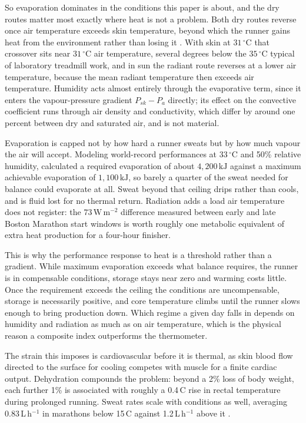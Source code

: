 \documentclass[11pt]{article}
\renewcommand{\_}{\textunderscore\allowbreak}
\begin{document}
So evaporation dominates in the conditions this paper is about, and the dry routes matter most exactly where heat is not a problem. Both dry routes reverse once air temperature exceeds skin temperature, beyond which the runner gains heat from the environment rather than losing it \citep{cheuvront2001}. With skin at $31\,^{\circ}$C that crossover sits near $31\,^{\circ}$C air temperature, several degrees below the $35\,^{\circ}$C typical of laboratory treadmill work, and in sun the radiant route reverses at a lower air temperature, because the mean radiant temperature then exceeds air temperature. Humidity acts almost entirely through the evaporative term, since it enters the vapour-pressure gradient $P_{sk}-P_a$ directly; its effect on the convective coefficient runs through air density and conductivity, which differ by around one percent between dry and saturated air, and is not material.

Evaporation is capped not by how hard a runner sweats but by how much vapour the air will accept. Modeling world-record performances at $33\,^{\circ}$C and 50\% relative humidity, \citet{taylor2006} calculated a required evaporation of about $4{,}200\,\mathrm{kJ}$ against a maximum achievable evaporation of $1{,}100\,\mathrm{kJ}$, so barely a quarter of the sweat needed for balance could evaporate at all. Sweat beyond that ceiling drips rather than cools, and is fluid lost for no thermal return. Radiation adds a load air temperature does not register: the $73\,\mathrm{W\,m^{-2}}$ difference \citet{cheuvront2021} measured between early and late Boston Marathon start windows is worth roughly one metabolic equivalent of extra heat production for a four-hour finisher.

This is why the performance response to heat is a threshold rather than a gradient. While maximum evaporation exceeds what balance requires, the runner is in compensable conditions, storage stays near zero and warming costs little. Once the requirement exceeds the ceiling the conditions are uncompensable, storage is necessarily positive, and core temperature climbs until the runner slows enough to bring production down. Which regime a given day falls in depends on humidity and radiation as much as on air temperature, which is the physical reason a composite index outperforms the thermometer.

The strain this imposes is cardiovascular before it is thermal, as skin blood flow directed to the surface for cooling competes with muscle for a finite cardiac output. Dehydration compounds the problem: beyond a 2\% loss of body weight, each further 1\% is associated with roughly a 0.4\,\textdegree C rise in rectal temperature during prolonged running. Sweat rates scale with conditions as well, averaging 0.83\,L\,h$^{-1}$ in marathons below 15\,\textdegree C against 1.2\,L\,h$^{-1}$ above it \citep{cheuvront2001}.
\end{document}
